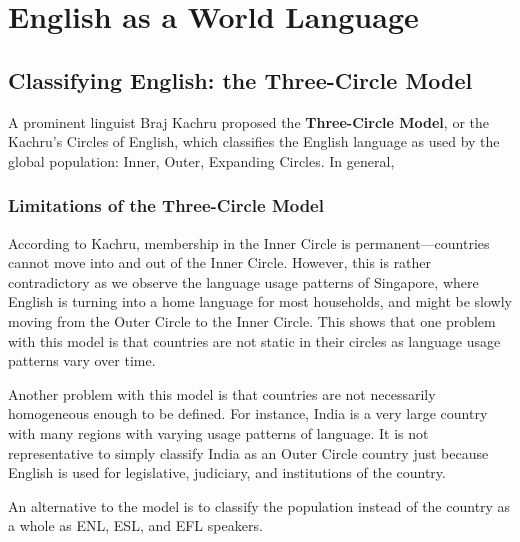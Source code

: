 \documentclass[../main.tex]{subfiles}
\begin{document}
    \chapter{English as a World Language}
    
    \section{Classifying English: the Three-Circle Model}
        A prominent linguist Braj Kachru proposed the \textbf{Three-Circle Model}, or the Kachru's Circles of English, which classifies the English language as used by the global population: Inner, Outer, Expanding Circles. In general, 


        \subsection{Limitations of the Three-Circle Model}
            According to Kachru, membership in the Inner Circle is permanent---countries cannot move into and out of the Inner Circle. However, this is rather contradictory as we observe the language usage patterns of Singapore, where English is turning into a home language for most households, and might be slowly moving from the Outer Circle to the Inner Circle. This shows that one problem with this model is that countries are not static in their circles as language usage patterns vary over time. \par
            Another problem with this model is that countries are not necessarily homogeneous enough to be defined. For instance, India is a very large country with many regions with varying usage patterns of language. It is not representative to simply classify India as an Outer Circle country just because English is used for legislative, judiciary, and institutions of the country. \par
            An alternative to the model is to classify the population instead of the country as a whole as ENL, ESL, and EFL speakers. 
\end{document}

